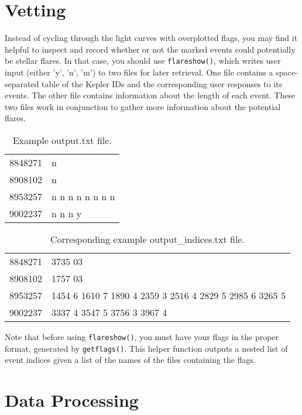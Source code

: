 \documentclass{article}
\begin{document}
\section{Vetting}
\label{sec:vet}

Instead of cycling through the light curves with overplotted flags,
you may find it helpful to inspect and record whether or not the
marked events could potentially be stellar flares.  In that case, you
should use \verb|flareshow()|, which writes user input (either 'y',
'n', 'm') to two files for later retrieval.  One file contains a
space-separated table of the Kepler IDs and the corresponding user
responses to its events.  The other file contains information about
the length of each event.  These two files work in conjunction to
gather more information about the potential flares.

\begin{table}[h]
  \centering
  \begin{tabular}{l l}

8848271 &  n \\
8908102 &  n \\
8953257 &  n  n  n  n  n  n  n  n \\
9002237 &  n  n  n  y \\
\end{tabular}
\caption{Example output.txt file.}
\end{table}



\begin{table}[h]
  \centering
  \begin{tabular}{l l}

8848271 &  3735 03 \\
8908102 &  1757 03 \\
8953257 &  1454  6 1610  7 1890  4 2359  3 2516  4 2829  5 2985  6
3265  5 \\
9002237 &  3337  4 3547  5 3756  3 3967  4 \\
\end{tabular}
\caption{Corresponding example output\_indices.txt file.}
\end{table}

Note that before using \verb|flareshow()|, you must have your flags in
the proper format, generated by \verb|getflags()|.  This helper
function outputs a nested list of event indices given a list of the
names of the files containing the flags.

\section{Data Processing}
\label{sec:advanced}
\end{document}
